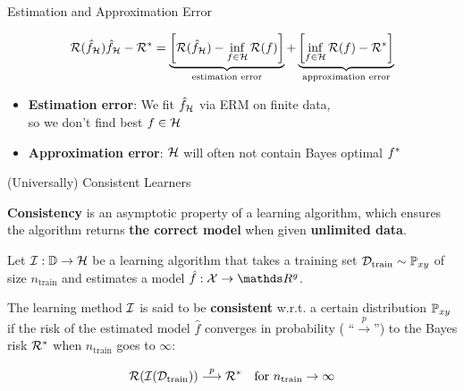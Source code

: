 \documentclass[11pt,compress,t,notes=noshow, xcolor=table]{beamer}
\begin{document}
\begin{frame}{Estimation and Approximation Error} 




$$
\mathcal{R}(\hat f_{\mathcal{H}}) \hat f_{\mathcal{H}} - \mathcal{R}^\ast = \underbrace{\left[\mathcal{R}(\hat f_{\mathcal{H}}) - \inf_{f \in \mathcal{H}} \mathcal{R}(f)\right]}_{\text{estimation error}} + \underbrace{\left[\inf_{f \in \mathcal{H}} \mathcal{R}(f) - \mathcal{R}^\ast\right]}_{\text{approximation error}}  
$$

\vfill

\begin{itemize}
\item \textbf{Estimation error}:
We fit $\hat f_{\mathcal{H}}$ via ERM on finite data, \\
so we don't find best $f \in \mathcal{H}$
\item \textbf{Approximation error}: 
$\mathcal{H}$ will often not contain Bayes optimal $f^{\ast}$ 
\end{itemize}

\end{frame}


\begin{frame}{(Universally) Consistent Learners }

\textbf{Consistency} is an asymptotic property of a learning algorithm, which ensures the algorithm returns \textbf{the correct model} when given \textbf{unlimited data}.

\vfill 

Let $\mathcal{I}:\mathbb{D} \to \mathcal{H}$ be a learning algorithm that takes a training set $\mathcal{D}_{\text{train}} \sim \mathbb{P}_{xy}$ of size $n_\text{train}$ and estimates a model $\hat f: \Xspace \to \R^g$. 

\vfill 

The learning method $\mathcal{I}$ is said to be \textbf{consistent} w.r.t. a certain distribution $\mathbb{P}_{xy}$ if the risk of the estimated model $\hat f$ converges in probability ( \enquote{$\overset{p}{\longrightarrow}$}) to the Bayes risk $\mathcal{R}^\ast$ when $n_\text{train}$ goes to $\infty$: 

$$
\mathcal{R}(\mathcal{I}(\mathcal{D}_{\text{train}})) \overset{p}{\longrightarrow} \mathcal{R}^\ast \quad \text{for } n_\text{train} \to \infty
$$

\end{frame}
\end{document}
